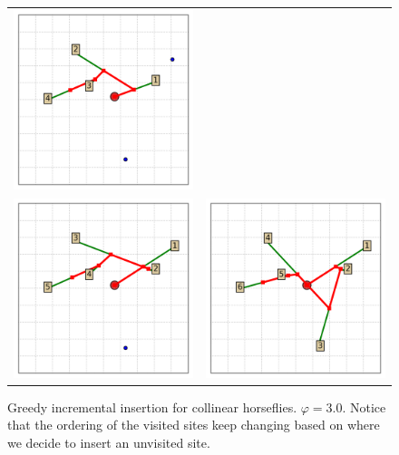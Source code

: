 \documentclass[11.5pt]{report}
\begin{document}
\begin{figure}[H]
\begin{tabular}{cc}
\includegraphics[width=8cm]{../webs/docs/algo-greedy-incremental-insertion---Day-2018-12-24_ClockTime-19:31:02/algo_state_00003.png}\\
\includegraphics[width=8cm]{../webs/docs/algo-greedy-incremental-insertion---Day-2018-12-24_ClockTime-19:31:02/algo_state_00004.png}&
\includegraphics[width=8cm]{../webs/docs/algo-greedy-incremental-insertion---Day-2018-12-24_ClockTime-19:31:02/algo_state_00005.png}\\
\end{tabular}
\caption{Greedy incremental insertion for collinear horseflies. $\varphi=3.0$. Notice that 
the ordering of the visited sites keep changing based on where we decide to insert an 
unvisited site.}
\label{fig:greedy-incremental-example}
\end{figure}
\end{document}
